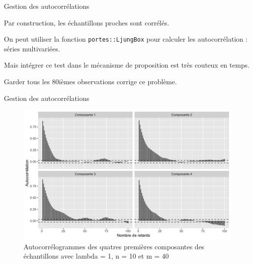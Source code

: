 \documentclass[10pt,xcolor=table,color={dvipsnames,usenames},ignorenonframetext,usepdftitle=false,french]{beamer}
\begin{document}
\begin{frame}[fragile]{Gestion des autocorrélations}
\protect\hypertarget{gestion-des-autocorruxe9lations}{}

Par construction, les échantillons proches sont corrélés.

On peut utiliser la fonction \texttt{portes::LjungBox} pour calculer les
autocorrélation : séries multivariées.

Mais intégrer ce test dans le mécanisme de proposition est très couteux
en temps.

Garder tous les 80ièmes observations corrige ce problème.

\end{frame}

\begin{frame}{Gestion des autocorrélations}
\protect\hypertarget{gestion-des-autocorruxe9lations-1}{}

\begin{figure}
\includegraphics[width=33.33in]{img/acfn10m40} \caption{Autocorrélogrammes des quatres premières composantes des échantillons avec lambda = 1, n = 10 et m = 40}\label{fig:acfn10m40}
\end{figure}

\end{frame}
\end{document}
